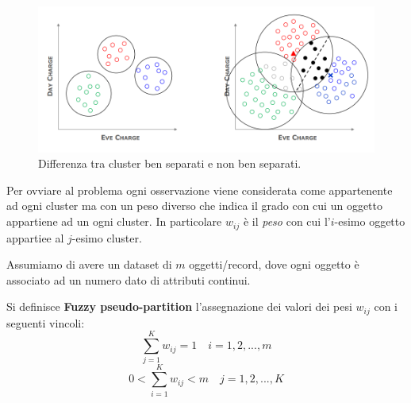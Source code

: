 \begin{figure}[H]
	\centering
	\includegraphics[height=0.4 \linewidth]{clustering/pict/frontiera.png}
	\caption{Differenza tra cluster ben separati e non ben separati.}
\end{figure}
Per ovviare al problema ogni osservazione viene considerata come appartenente ad ogni cluster ma con un peso diverso che indica il grado con cui un oggetto appartiene ad un ogni cluster. In particolare $w_{ij}$ è il \textit{peso} con cui l'$i$-esimo oggetto appartiee al $j$-esimo cluster.

Assumiamo di avere un dataset di $m$ oggetti/record, dove ogni oggetto è associato ad un numero dato di attributi continui.

\begin{defn}
	Si definisce \textbf{Fuzzy pseudo-partition} l'assegnazione dei valori dei pesi $w_{ij}$ con i seguenti vincoli:
	\[\sum_{j = 1}^{K}w_{ij} = 1 \quad i=1,2,...,m\]
	\[0 < \sum_{i = 1}^{K}w_{ij} <  m \quad j=1,2,...,K\]
\end{defn} 

